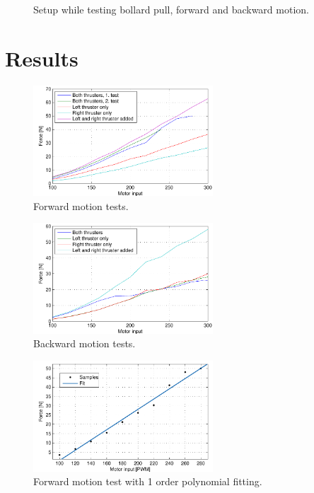 \begin{figure}[htbp]
	\centering
	
	\caption{Setup while testing bollard pull, forward and backward motion.}
	\label{fig:bollpullsetup}
\end{figure}


\section{Results}
\begin{figure}[htbp]
	\centering
	\includegraphics[width=0.6\textwidth]{plot/forwardthrust}
	\caption{Forward motion tests.}
	\label{fig:bollpullforward}
\end{figure}

\begin{figure}[htbp]
	\centering
	\includegraphics[width=0.6\textwidth]{plot/backthrust}
	\caption{Backward motion tests.}
	\label{fig:bollpullbackward}
\end{figure}

\begin{figure}[htbp]
	\centering
	\includegraphics[width=0.6\textwidth]{plot/both_force_1_1order}
	\caption{Forward motion test with 1 order polynomial fitting.}
	\label{fig:1_1order}
\end{figure}

